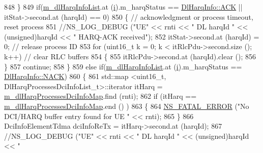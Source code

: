 \begin{DoxyCode}
848                         \}
849                         \textcolor{keywordflow}{if}(\hyperlink{classns3_1_1MmWaveFlexTtiMaxRateMacScheduler_a06e986195cd0656360fe3b94ac65d6ad}{m\_dlHarqInfoList}.at (\hyperlink{bernuolliDistribution_8m_a6f6ccfcf58b31cb6412107d9d5281426}{i}).m\_harqStatus == 
      \hyperlink{structns3_1_1DlHarqInfo_a922d2bc13ae01f93cde1a8b4bfccad14a8d3ab99ad8902cfbc5929336966de3ef}{DlHarqInfo::ACK} || itStat->second.at (harqId) == 0)
850                         \{ \textcolor{comment}{// acknowledgment or process timeout, reset process}
851                                 \textcolor{comment}{//NS\_LOG\_DEBUG ("UE" << rnti << " DL harqId " << (unsigned)harqId << "
       HARQ-ACK received");}
852                                 itStat->second.at (harqId) = 0;    \textcolor{comment}{// release process ID}
853                                 \textcolor{keywordflow}{for} (uint16\_t k = 0; k < itRlcPdu->second.size (); k++)         \textcolor{comment}{// clear
       RLC buffers}
854                                 \{
855                                         itRlcPdu->second.at (harqId).clear ();
856                                 \}
857                                 \textcolor{keywordflow}{continue};
858                         \}
859                         \textcolor{keywordflow}{else} \textcolor{keywordflow}{if}(\hyperlink{classns3_1_1MmWaveFlexTtiMaxRateMacScheduler_a06e986195cd0656360fe3b94ac65d6ad}{m\_dlHarqInfoList}.at (\hyperlink{bernuolliDistribution_8m_a6f6ccfcf58b31cb6412107d9d5281426}{i}).m\_harqStatus == 
      \hyperlink{structns3_1_1DlHarqInfo_a922d2bc13ae01f93cde1a8b4bfccad14ae0560b883a5e22a4d4c40ac562e80374}{DlHarqInfo::NACK})
860                         \{
861                                 std::map <uint16\_t, DlHarqProcessesDciInfoList\_t>::iterator itHarq = 
      \hyperlink{classns3_1_1MmWaveFlexTtiMaxRateMacScheduler_a1595e5398c1750599918db31324a3d68}{m\_dlHarqProcessesDciInfoMap}.find (rnti);
862                                 \textcolor{keywordflow}{if} (itHarq == \hyperlink{classns3_1_1MmWaveFlexTtiMaxRateMacScheduler_a1595e5398c1750599918db31324a3d68}{m\_dlHarqProcessesDciInfoMap}.end ()
      )
863                                 \{
864                                         \hyperlink{group__fatal_ga5131d5e3f75d7d4cbfd706ac456fdc85}{NS\_FATAL\_ERROR} (\textcolor{stringliteral}{"No DCI/HARQ buffer entry found for
       UE "} << rnti);
865                                 \}
866                                 DciInfoElementTdma dciInfoReTx = itHarq->second.at (harqId);
867                                 \textcolor{comment}{//NS\_LOG\_DEBUG ("UE" << rnti << " DL harqId " << (unsigned)harqId << "
}
\end{DoxyCode}
